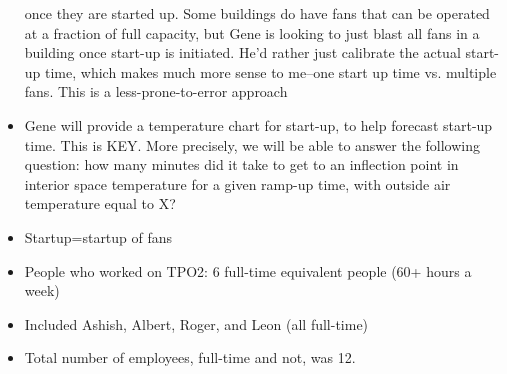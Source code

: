 \documentclass[12pt]{article}
\begin{document}
\begin{itemize}
		once they are started up. Some buildings do have fans that can be operated
		at a fraction of full capacity, but Gene is looking to just blast all fans
		in a building once start-up is initiated. He'd rather just calibrate
		the actual start-up time, which makes much more sense to me--one start up
		time vs. multiple fans. This is a less-prone-to-error approach
	\item Gene will provide a temperature chart for start-up, to help forecast
		start-up time. This is KEY. More precisely, we will be able to answer the
		following question: how many minutes did it take to get to an inflection
		point in interior space temperature for a given ramp-up time, with outside
		air temperature equal to X?
	\item Startup=startup of fans
	\item People who worked on TPO2: 6 full-time equivalent people (60+ hours
		a week)
	\item Included Ashish, Albert, Roger, and Leon (all full-time)
	\item Total number of employees, full-time and not, was 12.
\end{itemize}
\end{document}
